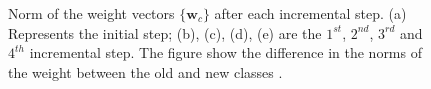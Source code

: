 \begin{figure}%
    \hspace*{-1.25 cm}
	\caption{Norm of the weight vectors $\{\textbf{w}_c\}$ after each incremental step. (a) Represents the initial step; (b), (c), (d), (e) are the $1^{st}$, $2^{nd}$, $3^{rd}$ and $4^{th}$ incremental step. The figure show the difference in the norms of the weight between the old and new classes \cite{zhao2020maintaining}.}%
	\label{fig:wa-biased}
\end{figure}

